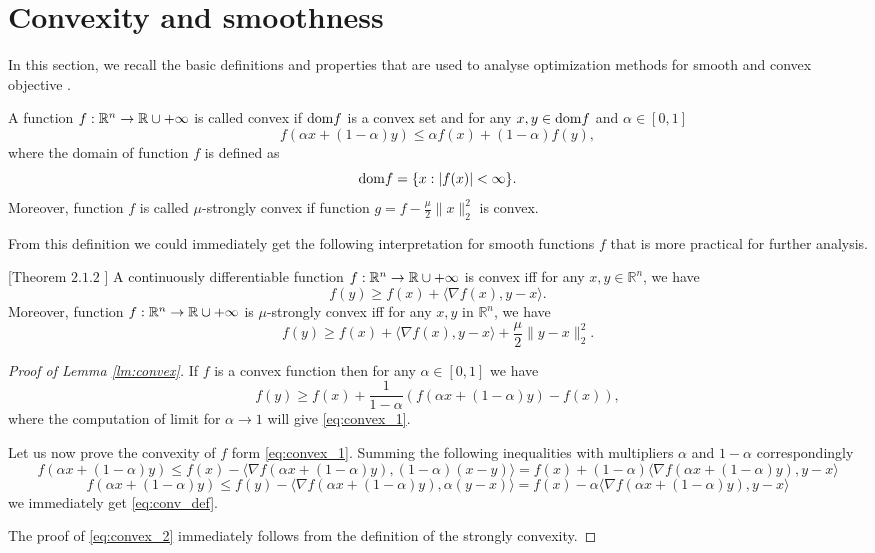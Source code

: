 \section{Convexity and smoothness}\label{sec:basics_conv_and_smoothness}
In this section, we recall the basic definitions and properties that are used to analyse optimization methods for smooth and convex objective \cite{hiriart2012fundamentals}. 
\begin{definition}
A function $f:\mathbb{R}^n\rightarrow \mathbb{R}\cup{+\infty}$ is called convex if $\mathrm{dom} f$ is a convex set and for any $x, y\in \mathrm{dom} f$ and $\alpha \in[0,1]$
\begin{equation}\label{eq:conv_def}
f(\alpha x + (1-\alpha)y)\leq \alpha f(x) + (1-\alpha)f(y),
\end{equation}
where the domain of function $f$ is defined as
$$
\mathrm{dom} f = \{x:|f(x)|<\infty\}.
$$
Moreover, function $f$ is called $\mu$-strongly convex if function $g = f - \frac{\mu}{2}\|x\|_2^2$ is convex.
\end{definition}

From this definition we could immediately get the following interpretation for smooth functions $f$ that is more practical for further analysis. 

\begin{lemma}\label{lm:convex}[Theorem $2.1.2$ \cite{nesterov-book}]
    A continuously differentiable function $f:\mathbb{R}^n\rightarrow \mathbb{R}\cup{+\infty}$ is convex iff for any $x,y\in\mathbb{R}^n$, we have
    \begin{equation}\label{eq:convex_1}
        f(y) \geq f(x) + \langle \nabla f(x), y-x\rangle.
    \end{equation}
    Moreover, function $f:\mathbb{R}^n\rightarrow \mathbb{R}\cup{+\infty}$ is $\mu$-strongly convex iff for any $x,y$ in $\mathbb{R}^n$, we have
    \begin{equation}\label{eq:convex_2}
        f(y) \geq f(x) + \langle \nabla f(x), y-x\rangle + \frac{\mu}{2}\|y-x\|_2^2.
    \end{equation}
\end{lemma}
\begin{proof}[Proof of Lemma \ref{lm:convex}]
If $f$ is a convex function then for any $\alpha\in[0,1]$ we have 
$$
f(y)\geq f(x) +\frac{1}{1-\alpha}\left(f(\alpha x + (1-\alpha)y) - f(x)\right),
$$
where the computation of limit for $\alpha \rightarrow 1$ will give \eqref{eq:convex_1}.

Let us now prove the convexity of $f$ form \eqref{eq:convex_1}.
Summing the following inequalities with multipliers $\alpha$ and $1-\alpha$ correspondingly
$$
f(\alpha x + (1-\alpha)y) \leq f(x) - \langle \nabla f(\alpha x + (1-\alpha)y), (1-\alpha)(x-y)\rangle = f(x) + (1-\alpha) \langle \nabla f(\alpha x + (1-\alpha)y), y-x\rangle
$$
$$
f(\alpha x + (1-\alpha)y) \leq f(y) - \langle \nabla f(\alpha x + (1-\alpha)y), \alpha(y-x)\rangle = f(x) - \alpha \langle \nabla f(\alpha x + (1-\alpha)y), y-x\rangle
$$
we immediately get \eqref{eq:conv_def}. 

The proof of \eqref{eq:convex_2} immediately follows from the definition of the strongly convexity.
\end{proof}

